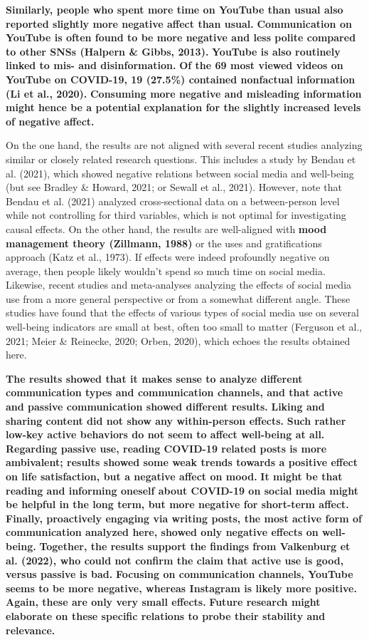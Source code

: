 \documentclass[
  man,mask]{apa7}
\begin{document}
\textbf{Similarly, people who spent more time on YouTube than usual also reported slightly more negative affect than usual.}
\textbf{Communication on YouTube is often found to be more negative and less polite compared to other SNSs (Halpern \& Gibbs, 2013).}
\textbf{YouTube is also routinely linked to mis- and disinformation.}
\textbf{Of the 69 most viewed videos on YouTube on COVID-19, 19 (27.5\%) contained nonfactual information (Li et al., 2020).}
\textbf{Consuming more negative and misleading information might hence be a potential explanation for the slightly increased levels of negative affect.}

On the one hand, the results are not aligned with several recent studies analyzing similar or closely related research questions.
This includes a study by Bendau et al. (2021), which showed negative relations between social media and well-being (but see Bradley \& Howard, 2021; or Sewall et al., 2021).
However, note that Bendau et al. (2021) analyzed cross-sectional data on a between-person level while not controlling for third variables, which is not optimal for investigating causal effects.
On the other hand, the results are well-aligned with \textbf{mood management theory (Zillmann, 1988)} or the uses and gratifications approach (Katz et al., 1973).
If effects were indeed profoundly negative on average, then people likely wouldn't spend so much time on social media.
Likewise, recent studies and meta-analyses analyzing the effects of social media use from a more general perspective or from a somewhat different angle.
These studies have found that the effects of various types of social media use on several well-being indicators are small at best, often too small to matter (Ferguson et al., 2021; Meier \& Reinecke, 2020; Orben, 2020), which echoes the results obtained here.

\textbf{The results showed that it makes sense to analyze different communication types and communication channels, and that active and passive communication showed different results.}
\textbf{Liking and sharing content did not show any within-person effects. }
\textbf{Such rather low-key active behaviors do not seem to affect well-being at all.}
\textbf{Regarding passive use, reading COVID-19 related posts is more ambivalent; results showed some weak trends towards a positive effect on life satisfaction, but a negative affect on mood.}
\textbf{It might be that reading and informing oneself about COVID-19 on social media might be helpful in the long term, but more negative for short-term affect.}
\textbf{Finally, proactively engaging via writing posts, the most active form of communication analyzed here, showed only negative effects on well-being.}
\textbf{Together, the results support the findings from Valkenburg et al. (2022), who could not confirm the claim that active use is good, versus passive is bad.}
\textbf{Focusing on communication channels, YouTube seems to be more negative, whereas Instagram is likely more positive.}
\textbf{Again, these are only very small effects.}
\textbf{Future research might elaborate on these specific relations to probe their stability and relevance.}
\end{document}
